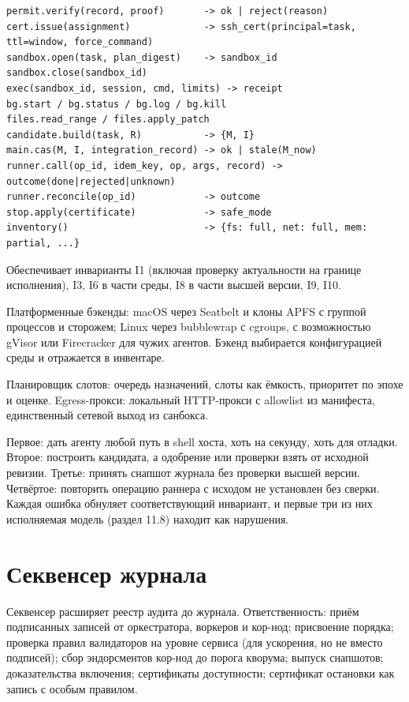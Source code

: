 \begin{exbox}
\begin{lstlisting}
permit.verify(record, proof)       -> ok | reject(reason)
cert.issue(assignment)             -> ssh_cert(principal=task, ttl=window, force_command)
sandbox.open(task, plan_digest)    -> sandbox_id
sandbox.close(sandbox_id)
exec(sandbox_id, session, cmd, limits) -> receipt
bg.start / bg.status / bg.log / bg.kill
files.read_range / files.apply_patch
candidate.build(task, R)           -> {M, I}
main.cas(M, I, integration_record) -> ok | stale(M_now)
runner.call(op_id, idem_key, op, args, record) -> outcome(done|rejected|unknown)
runner.reconcile(op_id)            -> outcome
stop.apply(certificate)            -> safe_mode
inventory()                        -> {fs: full, net: full, mem: partial, ...}
\end{lstlisting}
\end{exbox}

Обеспечивает инварианты I1 (включая проверку актуальности на границе исполнения), I3, I6 в части среды, I8 в части высшей версии, I9, I10.

Платформенные бэкенды: macOS через Seatbelt и клоны APFS с группой процессов и сторожем; Linux через bubblewrap с cgroups, с возможностью gVisor или Firecracker для чужих агентов. Бэкенд выбирается конфигурацией среды и отражается в инвентаре.

Планировщик слотов: очередь назначений, слоты как ёмкость, приоритет по эпохе и оценке. Egress-прокси: локальный HTTP-прокси с allowlist из манифеста, единственный сетевой выход из санбокса.

\begin{warnbox}
Первое: дать агенту любой путь в shell хоста, хоть на секунду, хоть для отладки. Второе: построить кандидата, а одобрение или проверки взять от исходной ревизии. Третье: принять снапшот журнала без проверки высшей версии. Четвёртое: повторить операцию раннера с исходом не установлен без сверки. Каждая ошибка обнуляет соответствующий инвариант, и первые три из них исполняемая модель (раздел 11.8) находит как нарушения.
\end{warnbox}

\section{Секвенсер журнала}

Секвенсер расширяет реестр аудита до журнала. Ответственность: приём подписанных записей от оркестратора, воркеров и кор-нод; присвоение порядка; проверка правил валидаторов на уровне сервиса (для ускорения, но не вместо подписей); сбор эндорсментов кор-нод до порога кворума; выпуск снапшотов; доказательства включения; сертификаты доступности; сертификат остановки как запись с особым правилом.

